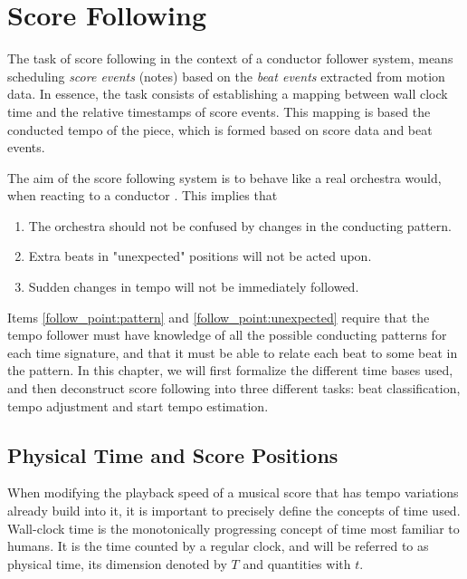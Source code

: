 \chapter{Score Following}
\label{chapter:score_following}

The task of score following in the context
of a conductor follower system,
means scheduling \textit{score events} (notes)
based on the \textit{beat events} extracted
from motion data.
In essence, the task consists of establishing a mapping between
wall clock time and the relative timestamps of score events.
This mapping is based the conducted tempo of the piece,
which is formed based on score data and beat events.

The aim of the score following system
is to behave like a real orchestra would,
when reacting to a conductor \cite{findsomecites?}.
This implies that
\begin{enumerate}
\item The orchestra should not be confused by changes in the conducting pattern. \label{follow_point:pattern}
\item Extra beats in "unexpected" positions will not be acted upon. \label{follow_point:unexpected}
\item Sudden changes in tempo will not be immediately followed.
\end{enumerate}
Items \ref{follow_point:pattern} and \ref{follow_point:unexpected} require
that the tempo follower must have knowledge of all the possible
conducting patterns for each time signature,
and that it must be able to relate each beat to some beat in the pattern.
In this chapter,
we will first formalize the different time bases used,
and then deconstruct score following into
three different tasks:
beat classification, tempo adjustment and start tempo estimation.

\section{Physical Time and Score Positions}
\label{sec:meth:read_and_score_time}

When modifying the playback speed of a musical score
that has tempo variations already build into it,
it is important to precisely define the concepts of time used.
Wall-clock time is the monotonically progressing concept of time
most familiar to humans.
It is the time counted by a regular clock,
and will be referred to as physical time,
its dimension denoted by $T$ and quantities with $t$.


